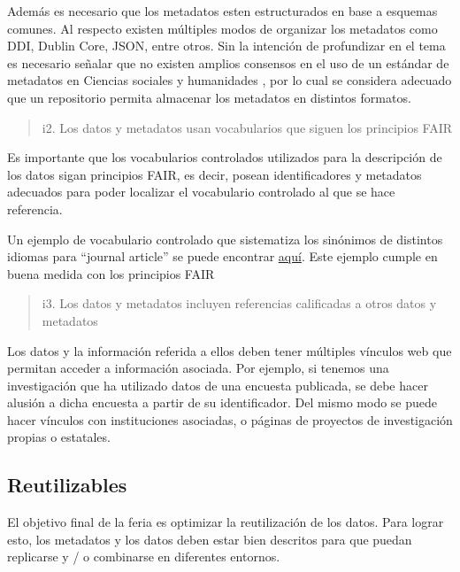 \documentclass[
  14pt,
]{book}
\begin{document}
Además es necesario que los metadatos esten estructurados en base a esquemas comunes. Al respecto existen múltiples modos de organizar los metadatos como DDI, Dublin Core, JSON, entre otros. Sin la intención de profundizar en el tema es necesario señalar que no existen amplios consensos en el uso de un estándar de metadatos en Ciencias sociales y humanidades \citep{gomez_Datos_2016}, por lo cual se considera adecuado que un repositorio permita almacenar los metadatos en distintos formatos.

\begin{quote}
i2. Los datos y metadatos usan vocabularios que siguen los principios FAIR
\end{quote}

Es importante que los vocabularios controlados utilizados para la descripción de los datos sigan principios FAIR, es decir, posean identificadores y metadatos adecuados para poder localizar el vocabulario controlado al que se hace referencia.

Un ejemplo de vocabulario controlado que sistematiza los sinónimos de distintos idiomas para ``journal article'' se puede encontrar \href{http://vocabularies.coar-repositories.org/pubby/resource_type/c_6501.html}{aquí}. Este ejemplo cumple en buena medida con los principios FAIR

\begin{quote}
i3. Los datos y metadatos incluyen referencias calificadas a otros datos y metadatos
\end{quote}

Los datos y la información referida a ellos deben tener múltiples vínculos web que permitan acceder a información asociada. Por ejemplo, si tenemos una investigación que ha utilizado datos de una encuesta publicada, se debe hacer alusión a dicha encuesta a partir de su identificador. Del mismo modo se puede hacer vínculos con instituciones asociadas, o páginas de proyectos de investigación propias o estatales.

\hypertarget{reutilizables}{%
\subsection{\texorpdfstring{\textbf{Reutilizables}}{Reutilizables}}\label{reutilizables}}

El objetivo final de la feria es optimizar la reutilización de los datos. Para lograr esto, los metadatos y los datos deben estar bien descritos para que puedan replicarse y / o combinarse en diferentes entornos.
\end{document}
